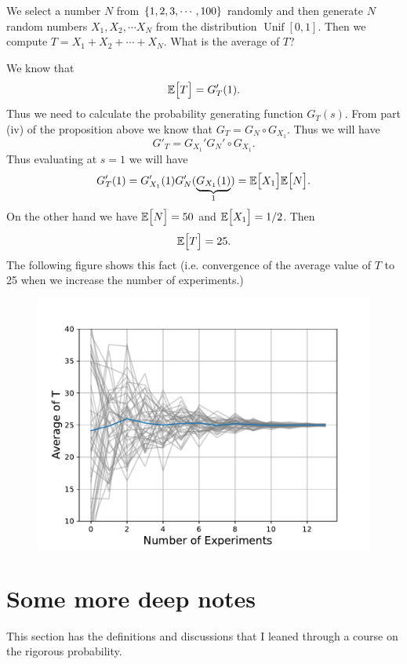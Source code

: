 \begin{example}
	We select a number $ N $ from $ \{1,2,3,\cdots,100\} $ randomly and then generate $ N $ random numbers $ X_1, X_2, \cdots X_N $ from the distribution $ \operatorname{Unif}[0,1]$. Then we compute $ T = X_1 + X_2 + \cdots +X_N $. What is the average of $ T $? 
	
	\begin{solution}
		We know that 
		\[ \mathbb{E}\big[T\big] = G'_T(1). \]
		Thus we need to calculate the probability generating function $ G_T(s) $. From part (iv) of the proposition above we know that $ G_T = G_N \circ G_{X_1} $. Thus we will have
		\[ G'_T = G_{X_1}' G_N'\circ G_{X_1}.  \]
		Thus evaluating at $ s=1 $ we will have
		\[ G'_T(1) = G_{X_1}'(1) G_N'(\underbrace{G_{X_1}(1)}_{1}) = \mathbb{E}\big[X_1\big] \mathbb{E}\big[N\big]. \]
		On the other hand we have $ \mathbb{E}\big[N\big] = 50 $ and $ \mathbb{E}\big[X_1\big] = 1/2 $. Then 
		\[ \mathbb{E}\big[T\big] = 25. \]
		The following figure shows this fact (i.e. convergence of the average value of $ T $ to 25 when we increase the number of experiments.)
		\begin{figure}[h!]
			\centering
			\includegraphics[width=0.5\linewidth]{Images/convergenceOfAverageExp.pdf}
		\end{figure}
		
 	\end{solution}
 	
\end{example}


\section{Some more deep notes}
This section has the definitions and discussions that I leaned through a course on the rigorous probability.

